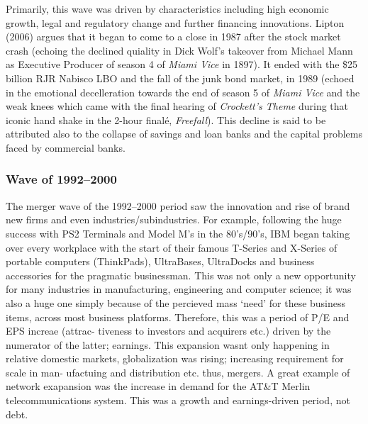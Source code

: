 \documentclass[11pt, english]{article}
\begin{document}
	Primarily, this wave was driven by characteristics including high economic growth, legal and regulatory change and further financing innovations. Lipton (2006) argues that it began to come to a close in 1987 after the stock market crash (echoing the declined quiality in Dick Wolf's takeover from Michael Mann as Executive Producer of season 4 of \textit{Miami Vice} in 1897). It ended with the \$25 billion RJR Nabisco LBO and the fall of the junk bond market, in 1989 (echoed in the emotional decelleration towards the end of season 5 of \textit{Miami Vice} and the weak knees which came with the final hearing of \textit{Crockett's Theme} during that iconic hand shake in the 2-hour final\'{e}, \textit{Freefall}). This decline is said to be attributed also to the collapse of savings and loan banks and the capital problems faced by commercial banks.

                \subsubsection*{Wave of 1992--2000}

        The merger wave of the 1992--2000 period saw the innovation and rise of brand new firms and even industries/subindustries. For example, following the huge success with PS2 Terminals and Model M’s in the 80’s/90’s, IBM began taking over every workplace with the start of their famous T-Series and X-Series of portable computers (ThinkPads), UltraBases, UltraDocks and business accessories for the pragmatic businessman. This was not only a new opportunity for many industries in manufacturing, engineering and computer science; it was also a huge one simply because of the percieved mass `need' for these business items, across most business platforms. Therefore, this was a period of P/E and EPS increae (attrac- tiveness to investors and acquirers etc.) driven by the numerator of the latter; earnings. This expansion wasnt only happening in relative domestic markets, globalization was rising; increasing requirement for scale in man- ufactuing and distribution etc. thus, mergers. A great example of network exapansion was the increase in demand for the AT\&T Merlin telecommunications system. This was a growth and earnings-driven period, not debt.\\
\end{document}
